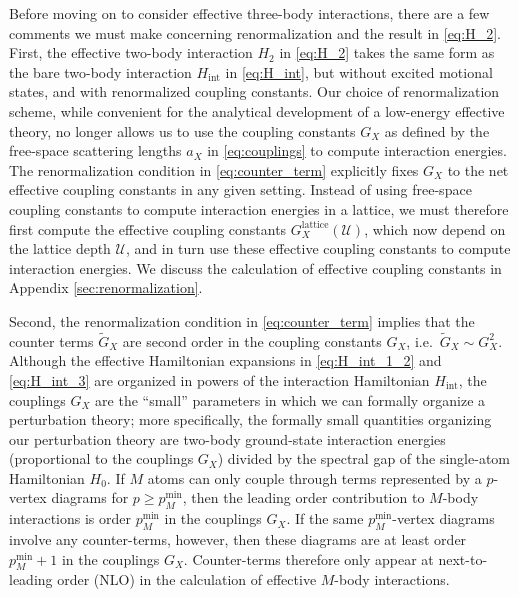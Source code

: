 \documentclass[preprint,showkeys,nofootinbib]{revtex4-1}
\renewcommand{\t}{\text} %
\newcommand{\p}[1]{\left(#1\right)} %
\newcommand{\U}{\mathcal{U}}
\newcommand{\1}{\mathds{1}}
\begin{document}
Before moving on to consider effective three-body interactions, there
are a few comments we must make concerning renormalization and the
result in \eqref{eq:H_2}.  First, the effective two-body interaction
$H_2$ in \eqref{eq:H_2} takes the same form as the bare two-body
interaction $H_{\t{int}}$ in \eqref{eq:H_int}, but without excited
motional states, and with renormalized coupling constants.  Our choice
of renormalization scheme, while convenient for the analytical
development of a low-energy effective theory, no longer allows us to
use the coupling constants $G_X$ as defined by the free-space
scattering lengths $a_X$ in \eqref{eq:couplings} to compute
interaction energies.  The renormalization condition in
\eqref{eq:counter_term} explicitly fixes $G_X$ to the net effective
coupling constants in any given setting.  Instead of using free-space
coupling constants to compute interaction energies in a lattice, we
must therefore first compute the effective coupling constants
$G_X^{\t{lattice}}\p{\U}$, which now depend on the lattice depth $\U$,
and in turn use these effective coupling constants to compute
interaction energies.  We discuss the calculation of effective
coupling constants in Appendix \ref{sec:renormalization}.

Second, the renormalization condition in \eqref{eq:counter_term}
implies that the counter terms $\tilde G_X$ are second order in the
coupling constants $G_X$, i.e.~$\tilde G_X\sim G_X^2$.  Although the
effective Hamiltonian expansions in \eqref{eq:H_int_1_2} and
\eqref{eq:H_int_3} are organized in powers of the interaction
Hamiltonian $H_{\t{int}}$, the couplings $G_X$ are the ``small''
parameters in which we can formally organize a perturbation theory;
more specifically, the formally small quantities organizing our
perturbation theory are two-body ground-state interaction energies
(proportional to the couplings $G_X$) divided by the spectral gap of
the single-atom Hamiltonian $H_0$.  If $M$ atoms can only couple
through terms represented by a $p$-vertex diagrams for
$p\ge p_M^{\t{min}}$, then the leading order contribution to $M$-body
interactions is order $p_M^{\t{min}}$ in the couplings $G_X$.  If the
same $p_M^{\t{min}}$-vertex diagrams involve any counter-terms,
however, then these diagrams are at least order $p_M^{\t{min}}+1$ in
the couplings $G_X$.  Counter-terms therefore only appear at
next-to-leading order (NLO) in the calculation of effective $M$-body
interactions.
\end{document}
